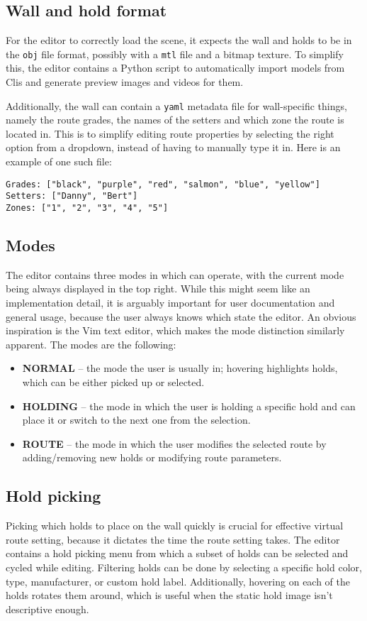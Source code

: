 \subsection{Wall and hold format}
For the editor to correctly load the scene, it expects the wall and holds to be in the \verb|obj| file format, possibly with a \verb|mtl| file and a bitmap texture.
To simplify this, the editor contains a Python script to automatically import models from Clis and generate preview images and videos for them.

Additionally, the wall can contain a \verb|yaml| metadata file for wall-specific things, namely the route grades, the names of the setters and which zone the route is located in.
This is to simplify editing route properties by selecting the right option from a dropdown, instead of having to manually type it in. Here is an example of one such file:

\begin{verbatim}
Grades: ["black", "purple", "red", "salmon", "blue", "yellow"]
Setters: ["Danny", "Bert"]
Zones: ["1", "2", "3", "4", "5"]
\end{verbatim}

\subsection{Modes}
The editor contains three modes in which can operate, with the current mode being always displayed in the top right.
While this might seem like an implementation detail, it is arguably important for user documentation and general usage, because the user always knows which state the editor.
An obvious inspiration is the Vim text editor, which makes the mode distinction similarly apparent.
The modes are the following:

\begin{itemize}
		\item \textbf{NORMAL} -- the mode the user is usually in; hovering highlights holds, which can be either picked up or selected.
		\item \textbf{HOLDING} -- the mode in which the user is holding a specific hold and can place it or switch to the next one from the selection.
		\item \textbf{ROUTE} -- the mode in which the user modifies the selected route by adding/removing new holds or modifying route parameters.
\end{itemize}

\subsection{Hold picking}
Picking which holds to place on the wall quickly is crucial for effective virtual route setting, because it dictates the time the route setting takes.
The editor contains a hold picking menu from which a subset of holds can be selected and cycled while editing.
Filtering holds can be done by selecting a specific hold color, type, manufacturer, or custom hold label.
Additionally, hovering on each of the holds rotates them around, which is useful when the static hold image isn't descriptive enough.

